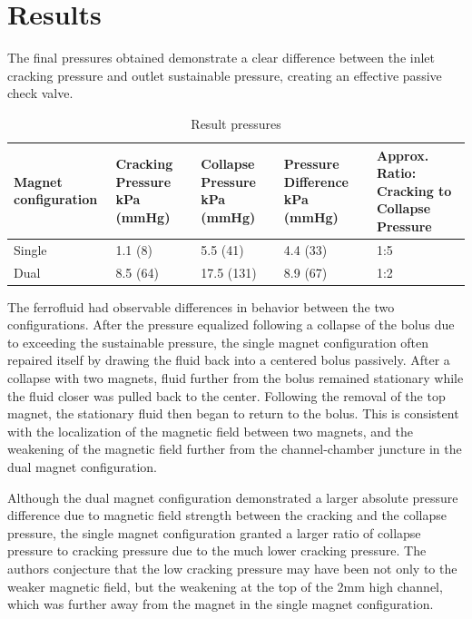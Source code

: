\documentclass[]{asme2ej}
\begin{document}
\section{Results}
The final pressures obtained demonstrate a clear difference between
the inlet cracking pressure and outlet sustainable pressure, creating
an effective passive check valve.

\begin{table}[t]
\footnotesize
\caption{Result pressures}
\begin{center}
\label{table_ASME}
\begin{tabular}{|p{0.3in} |p{0.4in} |p{0.49in} |p{0.45in} |p{0.6in} |}
\hline
Magnet configuration &
Cracking Pressure kPa  (mmHg) &
Collapse Pressure kPa  (mmHg) &
Pressure Difference kPa  (mmHg) &
Approx. Ratio: Cracking to Collapse Pressure \\
\hline
Single &
1.1 (8) &
5.5 (41) &
4.4 (33) &
1:5 \\
\hline
Dual &
8.5 (64) &
17.5 (131)&
8.9 (67)&
1:2 \\
\hline
\end{tabular}
\end{center}
\end{table}


The ferrofluid had observable differences in behavior between the two
configurations.  After the pressure equalized
following a collapse of the bolus due to
exceeding the sustainable pressure, the single magnet
configuration often repaired itself by drawing the fluid back
into a centered bolus passively.
After a collapse with two magnets, fluid further from the bolus
remained stationary while the fluid closer was pulled back to the
center. Following the removal of the top magnet, the stationary fluid
then began to return to the bolus. This is consistent with the
localization of the magnetic field between two magnets, and the
weakening of the magnetic field further from the channel-chamber
juncture in the dual magnet configuration.

Although the dual magnet configuration demonstrated a larger absolute
pressure difference due to magnetic field strength between the
cracking and the collapse pressure, the single magnet configuration
granted a larger ratio of collapse pressure to cracking
pressure due to the much lower cracking pressure.
The authors conjecture that the low cracking pressure may have
been not only to the weaker magnetic field, but the weakening at the
top of the 2mm high channel, which was further away from the magnet
in the single magnet configuration.
\end{document}
